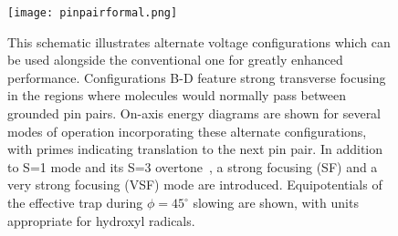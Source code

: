 \documentclass[%
 reprint,
 amsmath,amssymb,
 aps,
prl,
]{revtex4-1}
\begin{document}
\begin{figure}[]
\texttt{[image: pinpairformal.png]}%
\caption{
This schematic illustrates alternate voltage configurations which can be used alongside the conventional one for greatly enhanced performance. Configurations B-D feature strong transverse focusing in the regions where molecules would normally pass between grounded pin pairs. On-axis energy diagrams are shown for several modes of operation incorporating these alternate configurations, with primes indicating translation to the next pin pair. In addition to S=1 mode and its S=3 overtone~\cite{VanDeMeerakker2005a}, a strong focusing (SF) and a very strong focusing (VSF) mode are introduced. Equipotentials of the effective trap during $\phi=45^\circ$ slowing are shown, with units appropriate for hydroxyl radicals.\vspace{-4mm}
}
\label{fig:chargecartoon}
\end{figure}
\end{document}
